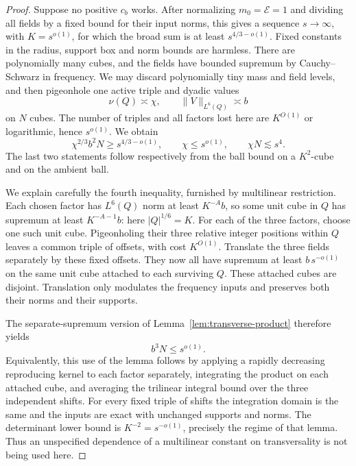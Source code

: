 \begin{proof}
Suppose no positive $c_b$ works.  After normalizing $m_0=\mathcal E=1$
and dividing all fields by a fixed bound for their input norms, this
gives a sequence $s\to\infty$, with $K=s^{o(1)}$, for which the broad
sum is at least $s^{4/3-o(1)}$.  Fixed constants in the radius, support
box and norm bounds are harmless.  There are polynomially many cubes,
and the fields have bounded supremum by Cauchy--Schwarz in frequency.
We may discard polynomially tiny mass and field levels, and then
pigeonhole one active triple and dyadic values
\[
 \nu(Q)\asymp\chi,\qquad \|V\|_{L^6(Q)}\asymp b
\]
on $N$ cubes.  The number of triples and all factors lost here are
$K^{O(1)}$ or logarithmic, hence $s^{o(1)}$.  We obtain
\begin{equation}\label{eq:sparse-saturation-bounds}
 \chi^{2/3}b^2N\ge s^{4/3-o(1)},\qquad
 \chi\le s^{o(1)},\qquad
 \chi N\lesssim s^4.
\end{equation}
The last two statements follow respectively from the ball bound on a
$K^2$-cube and on the ambient ball.

We explain carefully the fourth inequality, furnished by multilinear
restriction.  Each chosen factor has $L^6(Q)$ norm at least $K^{-A}b$,
so some unit cube in $Q$ has supremum at least $K^{-A-1}b$: here
$|Q|^{1/6}=K$.  For each of the three factors, choose one such unit
cube.  Pigeonholing their three relative integer positions within $Q$
leaves a common triple of offsets, with cost $K^{O(1)}$.  Translate
the three fields separately by these fixed offsets.  They now all have
supremum at least $b\,s^{-o(1)}$ on the same unit cube attached to each
surviving $Q$.  These attached cubes are disjoint.  Translation only
modulates the frequency inputs and preserves both their norms and
their supports.

The separate-supremum version of
Lemma~\ref{lem:transverse-product} therefore yields
\begin{equation}\label{eq:sparse-product-count}
 b^3N\le s^{o(1)}.
\end{equation}
Equivalently, this use of the lemma follows by applying a rapidly
decreasing reproducing kernel to each factor separately, integrating
the product on each attached cube, and averaging the trilinear integral
bound over the three independent shifts.  For every fixed triple of
shifts the integration domain is the same and the inputs are exact
with unchanged supports and norms.  The determinant lower bound is
$K^{-2}=s^{-o(1)}$, precisely the regime of that lemma.  Thus an
unspecified dependence of a multilinear constant on transversality is
not being used here.


\end{proof}
